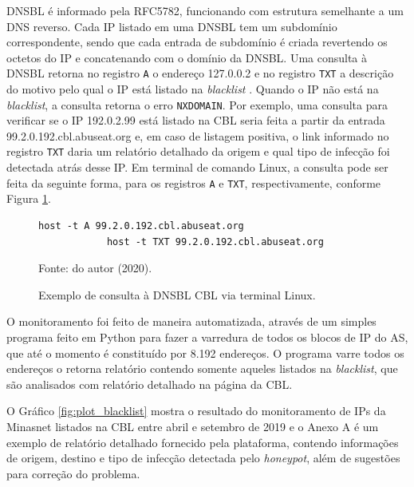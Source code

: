     DNSBL é informado pela RFC5782, funcionando com estrutura semelhante a um DNS reverso. Cada IP listado em uma DNSBL tem um subdomínio correspondente, sendo que cada entrada de subdomínio é criada revertendo os octetos do IP e concatenando com o domínio da DNSBL. Uma consulta à DNSBL retorna no registro {\tt A} o endereço 127.0.0.2 e no registro {\tt TXT} a descrição do motivo pelo qual o IP está listado na \textit{blacklist} \cite{rfc5782}. Quando o IP não está na \textit{blacklist}, a consulta retorna o erro {\tt NXDOMAIN}. Por exemplo, uma consulta para verificar se o IP 192.0.2.99 está listado na CBL seria feita a partir da entrada 99.2.0.192.cbl.abuseat.org e, em caso de listagem positiva, o link informado no registro {\tt TXT} daria um relatório detalhado da origem e qual tipo de infecção foi detectada atrás desse IP. Em terminal de comando Linux, a consulta pode ser feita da seguinte forma, para os registros {\tt A} e {\tt TXT}, respectivamente, conforme Figura \ref{fig:dnsbl_query}.
    
    \begin{figure}[!htb]
        \centering
        \caption{Exemplo de consulta à DNSBL CBL via terminal Linux.} 
        \label{fig:dnsbl_query}
        
        \begin{Verbatim}[fontsize=\small]
            host -t A 99.2.0.192.cbl.abuseat.org
            host -t TXT 99.2.0.192.cbl.abuseat.org
        \end{Verbatim} 

        {\small Fonte: do autor (2020).} 
    \end{figure}
    
    O monitoramento foi feito de maneira automatizada, através de um simples programa feito em Python para fazer a varredura de todos os blocos de IP do AS, que até o momento é constituído por 8.192 endereços. O programa varre todos os endereços o retorna relatório contendo somente aqueles listados na \textit{blacklist}, que são analisados com relatório detalhado na página da CBL.
    
    O Gráfico \ref{fig:plot_blacklist} mostra o resultado do monitoramento de IPs da Minasnet listados na CBL entre abril e setembro de 2019 e o Anexo A é um exemplo de relatório detalhado fornecido pela plataforma, contendo informações de origem, destino e tipo de infecção detectada pelo \textit{honeypot}, além de sugestões para correção do problema.
    
